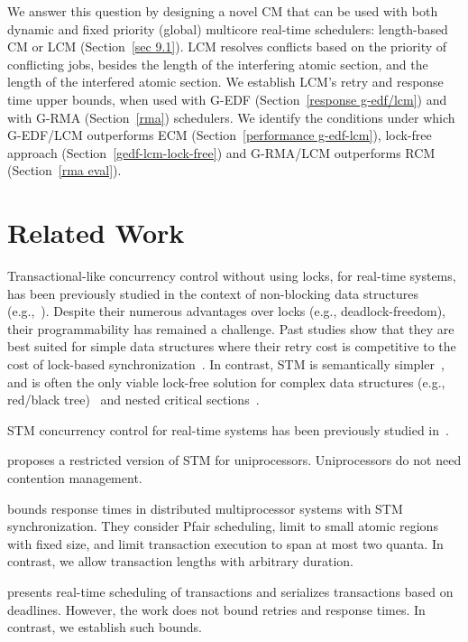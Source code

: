 \documentclass[conference]{sig-alternate}
\begin{document}
We answer this question by designing a novel CM that can be used with both dynamic and fixed priority (global) multicore real-time schedulers: length-based CM or LCM (Section~\ref{sec 9.1}). LCM resolves conflicts based on the priority of conflicting jobs, besides the length of the interfering atomic section, and the length of the interfered atomic section.  We establish LCM's retry and response time upper bounds, when used with G-EDF (Section~\ref{response g-edf/lcm}) and with G-RMA (Section~\ref{rma}) schedulers. We identify the conditions under which G-EDF/LCM outperforms ECM (Section~\ref{performance g-edf-lcm}), lock-free approach (Section~\ref{gedf-lcm-lock-free}) and G-RMA/LCM outperforms RCM (Section~\ref{rma eval}). 

\section{Related Work}
\label{sec:past}

Transactional-like concurrency control without using locks, for real-time systems, has been previously studied in the context of non-blocking data structures (e.g.,~\cite{anderson95realtime}). Despite their numerous advantages over locks 
(e.g., deadlock-freedom), 
their programmability has remained a challenge. 
Past studies show that they are best suited for simple data structures where their retry cost is competitive to the cost of lock-based synchronization~\cite{bc+08}.  In contrast, STM is semantically simpler~\cite{Herlihy:2006:AMP:1146381.1146382}, and is often the only viable lock-free solution for complex data structures (e.g., red/black tree)~\cite{key-1} and nested critical sections~\cite{Saha:2006:MHP:1122971.1123001}.

STM concurrency control for real-time systems has been previously studied in~\cite{manson2006preemptible,fahmy2009bounding,sarni2009real,schoeberl2010rttm,key-1,barrosmanaging,stmconcurrencycontrol:emsoft11}.


\cite{manson2006preemptible} proposes a restricted version of STM for uniprocessors. Uniprocessors do not need contention management.

\cite{fahmy2009bounding} bounds response times in distributed multiprocessor systems with STM synchronization. They consider Pfair scheduling, limit to small atomic regions with fixed size, and limit transaction execution to span at most two quanta. In contrast, we allow transaction lengths 
with  arbitrary duration. 

\cite{sarni2009real} presents real-time scheduling of transactions and serializes transactions based on deadlines. However, the work does not bound retries and response times. In contrast, we establish such bounds.
\end{document}
